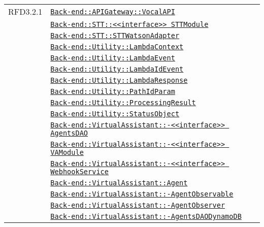 \begin{longtable}{|>{\centering}m{3cm}|m{10cm}<{\centering}|}
RFD3.2.1 & \hyperref[Back-end::APIGateway::VocalAPI]{\texttt{Back-end::APIGateway::VocalAPI}}\\
& \hyperref[Back-end::STT::<<interface>> STTModule]{\texttt{Back-end::STT::<<interface>> STTModule}}\\
& \hyperref[Back-end::STT::STTWatsonAdapter]{\texttt{Back-end::STT::STTWatsonAdapter}}\\
& \hyperref[Back-end::Utility::LambdaContext]{\texttt{Back-end::Utility::LambdaContext}}\\
& \hyperref[Back-end::Utility::LambdaEvent]{\texttt{Back-end::Utility::LambdaEvent}}\\
& \hyperref[Back-end::Utility::LambdaIdEvent]{\texttt{Back-end::Utility::LambdaIdEvent}}\\
& \hyperref[Back-end::Utility::LambdaResponse]{\texttt{Back-end::Utility::LambdaResponse}}\\
& \hyperref[Back-end::Utility::PathIdParam]{\texttt{Back-end::Utility::PathIdParam}}\\
& \hyperref[Back-end::Utility::ProcessingResult]{\texttt{Back-end::Utility::ProcessingResult}}\\
& \hyperref[Back-end::Utility::StatusObject]{\texttt{Back-end::Utility::StatusObject}}\\
& \hyperref[Back-end::VirtualAssistant::<<interface>> AgentsDAO]{\texttt{Back-end::VirtualAssistant::-\linebreak <<interface>> AgentsDAO}}\\
& \hyperref[Back-end::VirtualAssistant::<<interface>> VAModule]{\texttt{Back-end::VirtualAssistant::-\linebreak <<interface>> VAModule}}\\
& \hyperref[Back-end::VirtualAssistant::<<interface>> WebhookService]{\texttt{Back-end::VirtualAssistant::-\linebreak <<interface>> WebhookService}}\\
& \hyperref[Back-end::VirtualAssistant::Agent]{\texttt{Back-end::VirtualAssistant::Agent}}\\
& \hyperref[Back-end::VirtualAssistant::AgentObservable]{\texttt{Back-end::VirtualAssistant::-\linebreak AgentObservable}}\\
& \hyperref[Back-end::VirtualAssistant::AgentObserver]{\texttt{Back-end::VirtualAssistant::-\linebreak AgentObserver}}\\
& \hyperref[Back-end::VirtualAssistant::AgentsDAODynamoDB]{\texttt{Back-end::VirtualAssistant::-\linebreak AgentsDAODynamoDB}}\\

\end{longtable}

